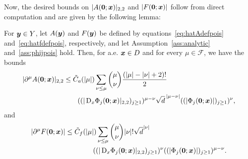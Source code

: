 Now, the desired bounds on $|A(\bm{0}; {{\bm{x}}})|_{2,2}$ and $|F(\bm{0}; {{\bm{x}}})|$ follow from direct computation and are given by the following lemma:
\begin{lemma}
    \label{thm:Afbound}
    For ${\bm{y}} \in Y $, let ${A}({\bm{y}})$ and $F({\bm{y}})$ be defined by equations~\eqref{eq:hatAdefpois} and~\eqref{eq:hatfdefpois}, respectively, and let Assumption~\ref{ass:analytic} and~\ref{ass:phijpois} hold.
    Then, for a.e. ${{\bm{x}}} \in {D}$ and for every $\mu \in \mathcal{F}$, we have the bounds
    \begin{align*}
        |\partial^\mu{A}(\bm{0}; {{\bm{x}}})|_{2,2} &\leq {\tilde{C}_a}(|\mu|)  \sum_{ \nu \leq \mu} \binom{\mu}{\nu} \frac{(|\mu| - |\nu| + 2)!}{2} \nonumber\\
        &\qquad((|\mathop{}\!\mathrm{D}_x \Phi_j(\bm{0}; {{\bm{x}}})|_{2,2} )_{j \geq 1})^{\mu - \nu} \sqrt{d}^{\,|\mu - \nu|} ((| \Phi_j(\bm{0}; {{\bm{x}}})| )_{j \geq 1})^{ \nu},
    \end{align*}
    and
    \begin{align*}
        |\partial^\mu F(\bm{0}; {{\bm{x}}})| &\leq {\tilde{C}_f}(|\mu|)   \sum_{\nu \leq \mu} \binom{\mu}{ \nu } |\nu |!\sqrt{d}^{|\nu |}\\
        &\qquad\qquad((|\mathop{}\!\mathrm{D}_x \Phi_j(\bm{0}; {{\bm{x}}})|_{2,2})_{j\geq 1})^\nu   ((|\Phi_j(\bm{0}; {{\bm{x}}})|)_{j \geq 1})^{\mu - \nu}.
    \end{align*}
\end{lemma}


